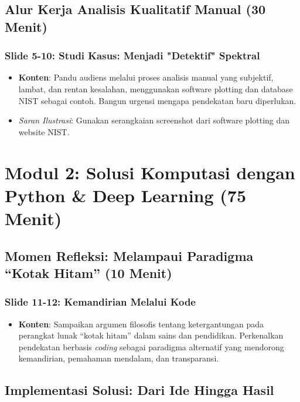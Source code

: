 \documentclass[12pt, a4paper]{article}
\begin{document}
\subsection{Alur Kerja Analisis Kualitatif Manual (30 Menit)}

\subsubsection*{Slide 5-10: Studi Kasus: Menjadi "Detektif" Spektral}
\begin{itemize}
    \item \textbf{Konten}: Pandu audiens melalui proses analisis manual yang subjektif, lambat, dan rentan kesalahan, menggunakan software plotting dan database NIST sebagai contoh. Bangun urgensi mengapa pendekatan baru diperlukan.
    \item \textit{Saran Ilustrasi}: Gunakan serangkaian screenshot dari software plotting dan website NIST.
\end{itemize}

\section{Modul 2: Solusi Komputasi dengan Python \& Deep Learning (75 Menit)}

\subsection{Momen Refleksi: Melampaui Paradigma ``Kotak Hitam'' (10 Menit)}

\subsubsection*{Slide 11-12: Kemandirian Melalui Kode}
\begin{itemize}
    \item \textbf{Konten}: Sampaikan argumen filosofis tentang ketergantungan pada perangkat lunak ``kotak hitam'' dalam sains dan pendidikan. Perkenalkan pendekatan berbasis \textit{coding} sebagai paradigma alternatif yang mendorong kemandirian, pemahaman mendalam, dan transparansi.
\end{itemize}

\subsection{Implementasi Solusi: Dari Ide Hingga Hasil}
\end{document}
